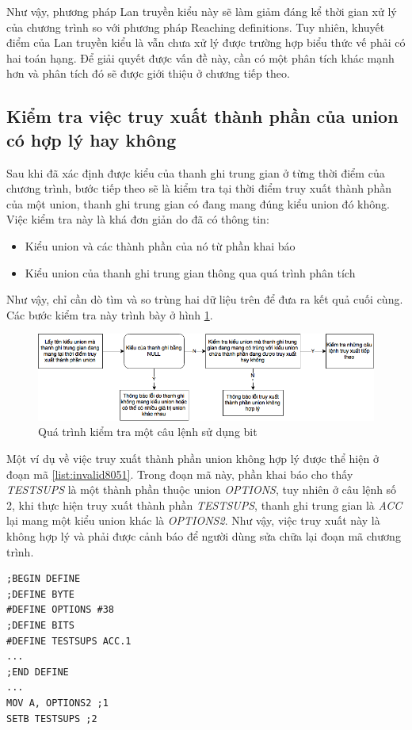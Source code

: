 Như vậy, phương pháp Lan truyền kiểu này sẽ làm giảm đáng kể thời gian xử lý của chương trình so với phương pháp Reaching definitions. Tuy nhiên, khuyết điểm của Lan truyền kiểu là vẫn chưa xử lý được trường hợp biểu thức vế phải có hai toán hạng. Để giải quyết được vấn đề này, cần có một phân tích khác mạnh hơn và phân tích đó sẽ được giới thiệu ở chương tiếp theo.
\subsection{Kiểm tra việc truy xuất thành phần của union có hợp lý hay không}

\label{sec:laststep}
Sau khi đã xác định được kiểu của thanh ghi trung gian ở từng thời điểm của chương trình, bước tiếp theo sẽ là kiểm tra tại thời điểm truy xuất thành phần của một union, thanh ghi trung gian có đang mang đúng kiểu union đó không. Việc kiểm tra này là khá đơn giản do đã có thông tin:
\begin{itemize}
	\item Kiểu union và các thành phần của nó từ phần khai báo
	\item Kiểu union của thanh ghi trung gian thông qua quá trình phân tích
\end{itemize}
Như vậy, chỉ cần dò tìm và so trùng hai dữ liệu trên để đưa ra kết quả cuối cùng. Các bước kiểm tra này trình bày ở hình \ref{fig:checkunionsteps}.
\begin{figure}
	\centering
	\includegraphics[width=\linewidth]{image/checkUnionSteps}
	\caption{Quá trình kiểm tra một câu lệnh sử dụng bit}
	\label{fig:checkunionsteps}
\end{figure}
Một ví dụ về việc truy xuất thành phần union không hợp lý được thể hiện ở đoạn mã \ref{list:invalid8051}. Trong đoạn mã này, phần khai báo cho thấy \textit{TESTSUPS} là một thành phần thuộc union \textit{OPTIONS}, tuy nhiên ở câu lệnh số 2, khi thực hiện truy xuất thành phần \textit{TESTSUPS}, thanh ghi trung gian là \textit{ACC} lại mang một kiểu union khác là \textit{OPTIONS2}. Như vậy, việc truy xuất này là không hợp lý và phải được cảnh báo để người dùng sửa chữa lại đoạn mã chương trình.
	\begin{lstlisting}[caption={Đoạn mã 8051 chứa một truy xuất thành phần union không hợp lý},label={list:invalid8051}]
;BEGIN DEFINE
;DEFINE BYTE
#DEFINE OPTIONS #38
;DEFINE BITS
#DEFINE TESTSUPS ACC.1
...
;END DEFINE
...
MOV A, OPTIONS2 ;1
SETB TESTSUPS ;2
\end{lstlisting}

